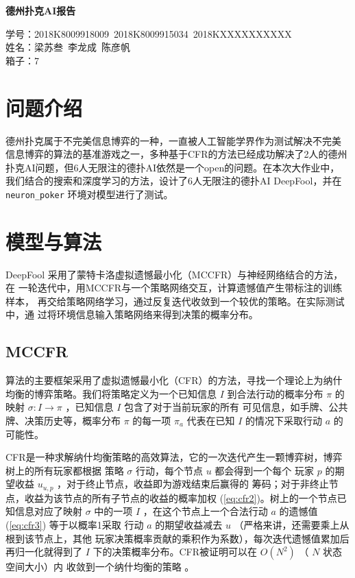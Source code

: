 \documentclass[11pt]{article}
\date{}
\title{}
\begin{document}
\pagestyle{fancy}
\chead{}

\begin{center}
  {\LARGE \bf 德州扑克AI报告}\\
\end{center}
\begin{flushright}
  { \heiti
    学号：2018K8009918009~2018K8009915034~2018KXXXXXXXXXX \\
    姓名：梁苏叁~李龙成~陈彦帆\\
    箱子：7 \\
  }
\end{flushright}


\section{问题介绍}
\label{sec:org5e5f5d8}
德州扑克属于不完美信息博弈的一种，一直被人工智能学界作为测试解决不完美
信息博弈的算法的基准游戏之一，多种基于CFR的方法已经成功解决了2人的德州
扑克AI问题，但6人无限注的德扑AI依然是一个open的问题。在本次大作业中，
我们结合的搜索和深度学习的方法，设计了6人无限注的德扑AI DeepFool，并在
\texttt{neuron\_poker} 环境对模型进行了测试。

\section{模型与算法}
\label{sec:org378e0a7}
DeepFool 采用了蒙特卡洛虚拟遗憾最小化（MCCFR）与神经网络结合的方法，在
一轮迭代中，用MCCFR与一个策略网络交互，计算遗憾值产生带标注的训练样本，
再交给策略网络学习，通过反复迭代收敛到一个较优的策略。在实际测试中，通
过将环境信息输入策略网络来得到决策的概率分布。

\subsection{MCCFR}
\label{sec:org8ffa411}
算法的主要框架采用了虚拟遗憾最小化（CFR）的方法，寻找一个理论上为纳什
均衡的博弈策略。我们将策略定义为一个已知信息 \(I\) 到合法行动的概率分布
\(\pi\) 的映射 \(\sigma:I\to\pi\) ，已知信息 \(I\) 包含了对于当前玩家的所有
可见信息，如手牌、公共牌、决策历史等，概率分布 \(\pi\) 的每一项 \(\pi_a\)
代表在已知 \(I\) 的情况下采取行动 \(a\) 的可能性。

CFR是一种求解纳什均衡策略的高效算法，它的一次迭代产生一颗博弈树，博弈
树上的所有玩家都根据 策略 \(\sigma\) 行动，每个节点 \(u\) 都会得到一个每个
玩家 \(p\) 的期望收益 \(u_{u,p}\) ，对于终止节点，收益即为游戏结束后赢得的
筹码；对于非终止节点，收益为该节点的所有子节点的收益的概率加权
(\ref{eq:cfr2})。树上的一个节点已知信息对应了映射 \(\sigma\) 中的一项 \(I\)
，在这个节点上一个合法行动 \(a\) 的遗憾值 (\ref{eq:cfr3}) 等于以概率1采取
行动 \(a\) 的期望收益减去 \(u\) （严格来讲，还需要乘上从根到该节点上，其他
玩家决策概率贡献的乘积作为系数），每次迭代遗憾值累加后再归一化就得到了
\(I\) 下的决策概率分布。CFR被证明可以在 \(O(N^2)\) （ \(N\) 状态空间大小）内
收敛到一个纳什均衡的策略 \cite{neller2013introduction} 。
\end{document}
